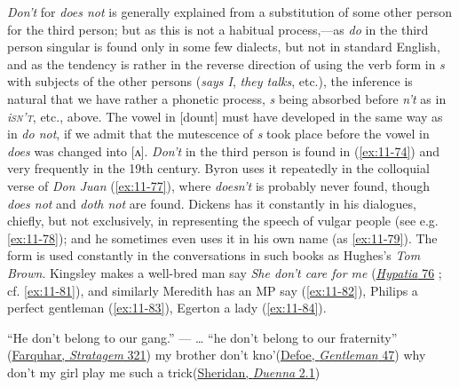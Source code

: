 \textit{Don't} for \textit{does not} is generally explained from a substitution of some other person for the third person; but as this is not a habitual process,---as \textit{do} in the third person singular is found only in some few dialects, but not in standard English, and as the tendency is rather in the reverse direction of using the verb form in \textit{s} with subjects of the other persons (\textit{says I}, \textit{they talks}, etc.), the inference is natural that we have rather a phonetic process, \textit{s} being absorbed before \textit{n't} as in \textit{i\textsc{sn't}}, etc., above. The vowel in [dount] must have developed in the same way as in \textit{do not}, if we admit that the mutescence of \textit{s} took place before the vowel in \textit{does} was changed into [ʌ]. \textit{Don't} in the third person is found in (\ref{ex:11-74}) and very frequently in the 19th century. Byron uses it repeatedly in the colloquial verse of \textit{Don Juan} (\ref{ex:11-77}), where \textit{doesn't} is probably never found, though \textit{does not} and \textit{doth not} are found. Dickens has it constantly in his dialogues, chiefly, but not exclusively, in representing the speech of vulgar people (see e.g. \ref{ex:11-78}); and he sometimes even uses it in his own name (as \ref{ex:11-79}). The form is used constantly in the conversations in such books as Hughes's \textit{Tom Brown}. Kingsley makes a well-bred man say \textit{She don't care for me} (\href{https://archive.org/details/hypatia00kinggoog/page/n110/mode/2up?q=%22she+don%27t+care%22&view=theater}{\textit{Hypatia} 76}%
; cf. \ref{ex:11-81}), and similarly Meredith has an MP say (\ref{ex:11-82}), Philips a perfect gentleman (\ref{ex:11-83}), Egerton a lady (\ref{ex:11-84}).

\ea \label{ex:11-74}
\ea
``He don't belong to our gang.'' --- {\dots} ``he don't belong to our fraternity''\\\hfill(\href{https://archive.org/details/beauxstratagema00fitzgoog/page/n41/mode/2up?q=%22he+don%27t%22&view=theater}{Farquhar, \textit{Stratagem} 321}) %
\ex
my brother don't kno'\hfill(\href{https://books.google.co.jp/books?hl=ja&id=WopaAAAAMAAJ&q=%22my%20brother%20don%27t%22&f=false#v=snippet&q=%22my%20brother%20don't%22&f=false}{Defoe, \textit{Gentleman} 47}) 
\ex
why don't my girl play me such a trick\hfill(\href{https://archive.org/details/bim_eighteenth-century_the-duenna-a-comic-oper_sheridan-richard-brinsl_1794/page/30/mode/2up?q=don%27t&view=theater}{Sheridan, \textit{Duenna} 2.1}) %
\z
\z

